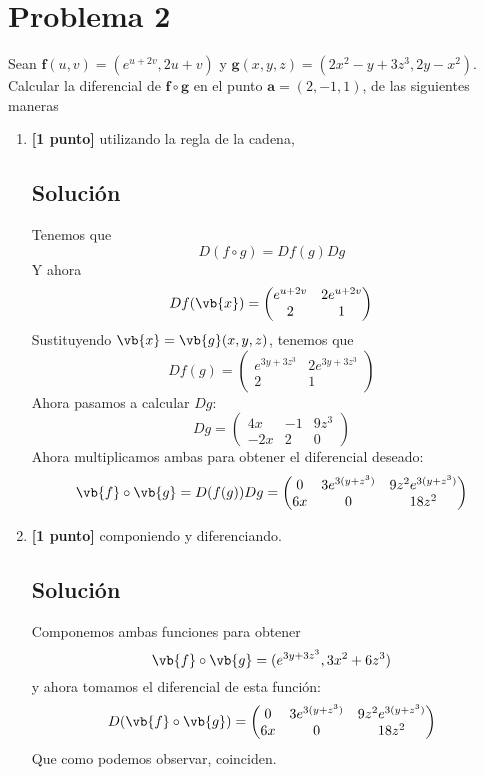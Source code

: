 \documentclass[12pt,a4paper,reqno]{article}
\begin{document}
	\section{Problema 2}
	Sean $\bm f(u,v)=\left(e^{u+2v},2u+v\right)$ y $\bm g(x,y,z)=\left(2x^2-y+3z^3,2y-x^2\right)$. Calcular la diferencial de $\bm f\circ\bm g$ en el punto $\bm a=(2,-1,1)$, de las siguientes maneras
	\begin{enumerate}[label={(\alph*)}]
		\item \textbf{[1 punto]} utilizando la regla de la cadena,
		
		\subsection*{Solución}
		Tenemos que
		\[
			D(f \circ g)=D f(g)Dg
		\]
		Y ahora
		\[
			D f(\vb{x})= \begin{pmatrix} 
				e^{u+2v} & 2e^{u+2v} \\2 & 1
			\end{pmatrix} 
		\]
		Sustituyendo $\vb{x}=\vb{g}(x,y,z)$, tenemos que
		\[
			D f(g)= \begin{pmatrix} 
				e^{3y+3z ^{3}} & 2 e^{3y +3z ^{3}} \\ 2 & 1
			\end{pmatrix} 
		\]
		Ahora pasamos a calcular $Dg$:
		\[
			Dg = \begin{pmatrix} 
				4x & -1 & 9z ^{3} \\ -2x & 2 & 0
			\end{pmatrix} 
		\]
		Ahora multiplicamos ambas para obtener el diferencial deseado:
		\[
			\vb{f} \circ \vb{g} = D(f(g))Dg = \begin{pmatrix} 
				0 & 3e^{3(y+z ^{3})} & 9z ^{2}e^{3(y+z^{3})}\\
				6x & 0 & 18z ^{2}
			\end{pmatrix} 
		\]
		\item \textbf{[1 punto]} componiendo y diferenciando.
		
		\subsection*{Solución}
		Componemos ambas funciones para obtener
		\[
			\vb{f}\circ \vb{g} = (e^{3y+3z^{3}},3x ^{2}+6z ^{3})
		\]
		y ahora tomamos el diferencial de esta función:
		\[
			D(\vb{f}\circ\vb{g}) = \begin{pmatrix} 
				0 & 3e^{3(y+z^{3})} & 9z^{2}e^{3(y+z^{3})}\\
				6x & 0 & 18z^{2}
			\end{pmatrix} 
		\]
		Que como podemos observar, coinciden.
	\end{enumerate}
	
\end{document}
